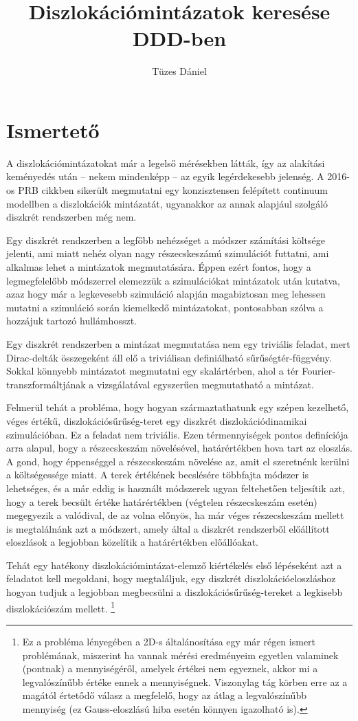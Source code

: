 \documentclass[10pt,a4paper]{scrartcl}
\title{Diszlokációmintázatok keresése DDD-ben}
\author{Tüzes Dániel}
\begin{document}
\maketitle
\tableofcontents

\section{Ismertető}
A diszlokációmintázatokat már a legelső mérésekben látták, így az alakítási keményedés után -- nekem mindenképp -- az egyik legérdekesebb jelenség. A 2016-os PRB cikkben sikerült megmutatni egy konzisztensen felépített continuum modellben a diszlokációk mintázatát, ugyanakkor az annak alapjául szolgáló diszkrét rendszerben még nem.

Egy diszkrét rendszerben a legfőbb nehézséget a módszer számítási költsége jelenti, ami miatt nehéz olyan nagy részecskeszámú szimulációt futtatni, ami alkalmas lehet a mintázatok megmutatására. Éppen ezért fontos, hogy a legmegfelelőbb módszerrel elemezzük a szimulációkat mintázatok után kutatva, azaz hogy már a legkevesebb szimuláció alapján magabiztosan meg lehessen mutatni a szimuláció során kiemelkedő mintázatokat, pontosabban szólva a hozzájuk tartozó hullámhosszt.

Egy diszkrét rendszerben a mintázat megmutatása nem egy triviális feladat, mert Dirac-delták összegeként áll elő a triviálisan definiálható sűrűségtér-függvény. Sokkal könnyebb mintázatot megmutatni egy skalártérben, ahol a tér Fourier-transzformáltjának a vizsgálatával egyszerűen megmutatható a mintázat.

Felmerül tehát a probléma, hogy hogyan származtathatunk egy szépen kezelhető, véges értékű, diszlokációsűrűség-teret egy diszkrét diszlokációdinamikai szimulációban. Ez a feladat nem triviális. Ezen térmennyiségek pontos definíciója arra alapul, hogy a részecskeszám növelésével, határértékben hova tart az eloszlás. A gond, hogy éppenséggel a részecskeszám növelése az, amit el szeretnénk kerülni a költségessége miatt. A terek értékének becslésére többfajta módszer is lehetséges, és a már eddig is használt módszerek ugyan feltehetően teljesítik azt, hogy a terek becsült értéke határértékben (végtelen részecskeszám esetén) megegyezik a valódival, de az volna előnyös, ha már véges részecskeszám mellett is megtalálnánk azt a módszert, amely által a diszkrét rendszerből előállított eloszlások a legjobban közelítik a határértékben előállóakat.

Tehát egy hatékony diszlokációmintázat-elemző kiértékelés első lépéseként azt a feladatot kell megoldani, hogy megtaláljuk, egy diszkrét diszlokációeloszláshoz hogyan tudjuk a legjobban megbecsülni a diszlokációsűrűség-tereket a legkisebb diszlokációszám mellett.
\footnote{Ez a probléma lényegében a 2D-s általánosítása egy már régen ismert problémának, miszerint ha vannak mérési eredményeim egyetlen valaminek (pontnak) a mennyiségéről, amelyek értékei nem egyeznek, akkor mi a legvalószínűbb értéke ennek a mennyiségnek. Viszonylag tág körben erre az a magától értetődő válasz a megfelelő, hogy az átlag a legvalószínűbb mennyiség (ez Gauss-eloszlású hiba esetén könnyen igazolható is).}
\end{document}
